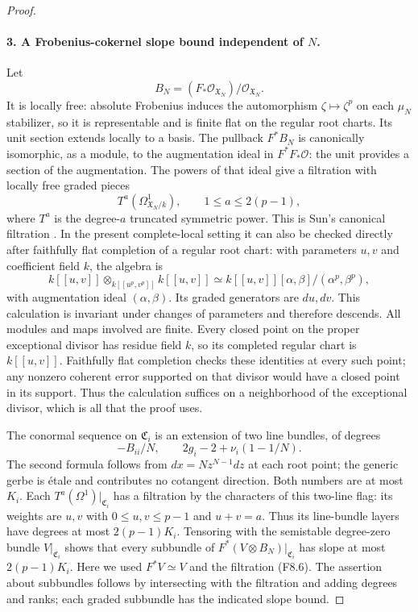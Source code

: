 \begin{proof}
\paragraph{3. A Frobenius-cokernel slope bound independent of $N$.}
Let
\[
 B_N=(F_*\mathcal O_{\mathfrak X_N})/\mathcal O_{\mathfrak X_N}.
\]
It is locally free: absolute Frobenius induces the automorphism
$\zeta\mapsto\zeta^p$ on each $\mu_N$ stabilizer, so it is
representable and is finite flat on the regular root charts. Its
unit section extends locally to a basis.
The pullback $F^*B_N$ is canonically isomorphic, as a module, to
the augmentation ideal in $F^*F_*\mathcal O$: the unit provides a
section of the augmentation. The powers of that ideal give a
filtration with locally free graded pieces
\[
 T^a(\Omega^1_{\mathfrak X_N/k}),\qquad 1\leq a\leq2(p-1),
 \tag{F8.6}
\]
where $T^a$ is the degree-$a$ truncated symmetric power.
This is Sun's canonical filtration
\cite[Theorem 3.7, pp.~12--13; local proof pp.~6--8]{Sun2008}.
In the present complete-local setting it can also be checked
directly after faithfully flat completion of a regular root chart:
with parameters $u,v$ and coefficient field $k$, the algebra is
\[
 k[[u,v]]\otimes_{k[[u^p,v^p]]}k[[u,v]]
 \simeq k[[u,v]][\alpha,\beta]/(\alpha^p,\beta^p),
\]
with augmentation ideal $(\alpha,\beta)$. Its graded generators
are $du,dv$. This calculation is invariant under changes of
parameters and therefore descends. All modules and maps involved are finite. Every closed point on
the proper exceptional divisor has residue field $k$, so its
completed regular chart is $k[[u,v]]$. Faithfully flat completion
checks these identities at every such point; any nonzero coherent
error supported on that divisor would have a closed point in its
support. Thus the calculation suffices on a neighborhood of the
exceptional divisor, which is all that the proof uses.

The conormal sequence on $\mathfrak C_i$ is an extension of two
line bundles, of degrees
\[
 -B_{ii}/N,\qquad
 2g_i-2+\nu_i(1-1/N).
 \tag{F8.7}
\]
The second formula follows from $dx=Nz^{N-1}dz$ at each root point;
the generic gerbe is \'etale and contributes no cotangent direction.
Both numbers are at most $K_i$. Each $T^a(\Omega^1)|_{\mathfrak C_i}$
has a filtration by the characters of this two-line flag: its
weights are $u,v$ with $0\leq u,v\leq p-1$ and $u+v=a$.
Thus its line-bundle layers have degrees at most $2(p-1)K_i$.
Tensoring with the semistable degree-zero bundle $V|_{\mathfrak C_i}$
shows that every subbundle of
$F^*(V\otimes B_N)|_{\mathfrak C_i}$ has slope at most
$2(p-1)K_i$. Here we used $F^*V\simeq V$ and the filtration (F8.6).
The assertion about subbundles follows by intersecting with the
filtration and adding degrees and ranks; each graded subbundle has
the indicated slope bound.


\end{proof}
